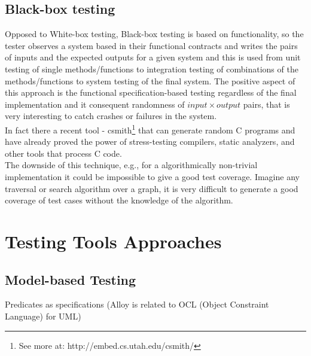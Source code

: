 \documentclass[citeauthoryear]{llncs}
\begin{document}
\subsection{Black-box testing}
Opposed to White-box testing, Black-box testing is based on functionality, so the tester observes a system based in their functional contracts and writes the
pairs of inputs and the expected outputs for a given system and this is used from unit testing of single methods/functions to integration testing
of combinations of the methods/functions to system testing of the final system. The positive aspect of this approach is the functional specification-based testing
regardless of the final implementation and it consequent randomness of $input \times output$ pairs, that is very interesting to catch crashes or failures in the system.\\
In fact there a recent tool - csmith\footnote{See more at: http://embed.cs.utah.edu/csmith/} that can generate random C programs and have already proved
the power of stress-testing compilers, static analyzers, and other tools that process C code\cite{Yang:2011:FUB:1993316.1993532}.\\

The downside of this technique, e.g., for a algorithmically non-trivial implementation it could be impossible to give a good test coverage.
Imagine any traversal or search algorithm over a graph, it is very difficult to generate a good coverage of test cases without the knowledge of the algorithm.

\section{Testing Tools Approaches}

\subsection{Model-based Testing}
Predicates as specifications (Alloy is related to OCL (Object Constraint Language) for UML)
\end{document}
